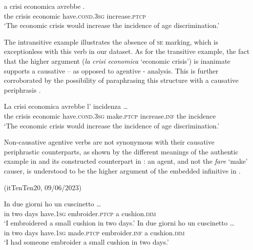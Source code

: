 \documentclass[output=paper,colorlinks,citecolor=brown
]{langscibook}
\begin{document}
\ea \label{bentley_example_9}
    \gll [L]a	crisi		economica	avrebbe 							.  \\
    the		crisis	economic		have.\textsc{cond}.3\textsc{sg}	increase.\textsc{ptcp}\\
    \glt ‘The economic crisis would increase the incidence of age discrimination.’
\z

The intransitive example illustrates the absence of \textsc{se} marking, which is exceptionless with this verb in our dataset. As for the transitive example, the fact that the higher argument (\textit{la crisi economica} ‘economic crisis’) is inanimate supports a causative – as opposed to agentive - analysis. This is further corroborated by the possibility of paraphrasing this structure with a causative periphrasis \citep[26—27 and references therein]{zribi1987reflexivite}.

\ea \label{bentley_example_10}
    \gll La	crisi		economica	avrebbe 							  l’ {incidenza \ldots }\\
    				the	crisis	economic		have.\textsc{cond}.3\textsc{sg}	make.\textsc{ptcp}	increase.\textsc{inf}	the incidence\\
    \glt  	‘The economic crisis would increase the incidence of age discrimination.’
\z

Non-causative agentive verbs are not synonymous with their causative periphrastic counterparts, as shown by the different meanings of the authentic example in  and its constructed counterpart in : an agent, and not the \textit{fare} ‘make’ causer, is understood to be the higher argument of the embedded infinitive in .

\hspace*{\fill}(itTenTen20, 09/06/2023)\quad

\ea \label{bentley_example_11}
    \ea \label{bentley_example_11a}
    \gll In	due	giorni	ho												un cuscinetto \ldots  \\
    in	two	days			have.1\textsc{sg}	embroider.\textsc{ptcp}	a			cushion.\textsc{dim}\\
    \glt ‘I embroidered a small cushion in two days.’
    \ex \label{bentley_example_11b}
    \gll In	due	giorni	ho																	un	cuscinetto \ldots  \\
   	in	two	days			have.1\textsc{sg}	made.\textsc{ptcp}	embroider.\textsc{inf}		a			cushion.\textsc{dim} \\
    \glt ‘I had someone embroider a small cushion in two days.’
    \z
\z
\end{document}
